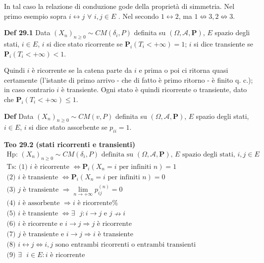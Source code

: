 \documentclass{article}
\begin{document}
In tal caso la relazione di conduzione gode della propriet\`{a} di
simmetria. Nel primo esempio sopra $i\leftrightarrow j$ $\forall $ $i,j\in E$%
. Nel secondo $1\leftrightarrow 2$, ma $1\not\leftrightarrow
3,2\not\leftrightarrow 3$.

\textbf{Def 29.1} Data $\left( X_{n}\right) _{n\geq 0}\sim CM\left( \delta
_{i},P\right) $ definita su $\left( \Omega ,\mathcal{A},\mathbf{P}\right) $, 
$E$ spazio degli stati, $i\in E$, $i$ si dice stato ricorrente se $\mathbf{P}%
_{i}\left( T_{i}<+\infty \right) =1$; $i$ si dice transiente se $\mathbf{P}%
_{i}\left( T_{i}<+\infty \right) <1$.

Quindi $i$ \`{e} ricorrente se la catena parte da $i$ e prima o poi ci
ritorna quasi certamente (l'istante di primo arrivo - che di fatto \`{e}
primo ritorno - \`{e} finito q. c.); in caso contrario $i$ \`{e} transiente.
Ogni stato \`{e} quindi ricorrente o transiente, dato che $\mathbf{P}%
_{i}\left( T_{i}<+\infty \right) \leq 1$.

\textbf{Def} Data $\left( X_{n}\right) _{n\geq 0}\sim CM\left( v,P\right) $
definita su $\left( \Omega ,\mathcal{A},\mathbf{P}\right) $, $E$ spazio
degli stati, $i\in E$, $i$ si dice stato assorbente se $p_{ii}=1$.

\textbf{Teo 29.2 (stati ricorrenti e transienti)}%
\begin{gather*}
\text{Hp: }\left( X_{n}\right) _{n\geq 0}\sim CM\left( \delta _{i},P\right) 
\text{ definita su }\left( \Omega ,\mathcal{A},\mathbf{P}\right) \text{, }E%
\text{ spazio degli stati, }i,j\in E \\
\text{Ts: (1) }i\text{ \`{e} ricorrente }\Longleftrightarrow \mathbf{P}%
_{i}\left( X_{n}=i\text{ per infiniti }n\right) =1 \\
\text{(2) }i\text{ \`{e} transiente }\Longleftrightarrow \mathbf{P}%
_{i}\left( X_{n}=i\text{ per infiniti }n\right) =0 \\
\text{(3) }j\text{ \`{e} transiente }\Longrightarrow \lim_{n\rightarrow
+\infty }p_{ij}^{\left( n\right) }=0 \\
\text{(4) }i\text{ \`{e} assorbente }\Longrightarrow i\text{ \`{e} ricorrente%
} \\
\text{(5) }i\text{ \`{e} transiente }\Longleftrightarrow \exists \text{ }%
j:i\rightarrow j\text{ e }j\nrightarrow i \\
\text{(6) }i\text{ \`{e} ricorrente e }i\rightarrow j\Longrightarrow j\text{ 
\`{e} ricorrente} \\
\text{(7) }j\text{ \`{e} transiente e }i\rightarrow j\Longrightarrow i\text{ 
\`{e} transiente} \\
\text{(8) }i\leftrightarrow j\Longleftrightarrow i,j\text{ sono entrambi
ricorrenti o entrambi transienti} \\
\text{(9) }\exists \text{ }i\in E:i\text{ \`{e} ricorrente}
\end{gather*}
\end{document}
